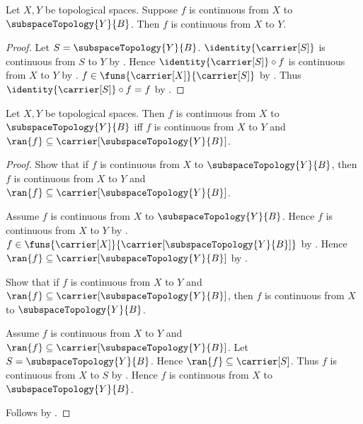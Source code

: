 \begin{theorem}\label{continuous_subspace_codomain_inclusion}
    Let $X,Y$ be topological spaces.
    Suppose $f$ is continuous from $X$ to
        $\subspaceTopology{Y}{B}$.
    Then $f$ is continuous from $X$ to $Y$.
\end{theorem}
\begin{proof}
    Let $S=\subspaceTopology{Y}{B}$.
    $\identity{\carrier[S]}$ is continuous from $S$ to $Y$
        by .
    Hence $\identity{\carrier[S]}\circ f$ is continuous from $X$ to $Y$
        by .
    $f\in\funs{\carrier[X]}{\carrier[S]}$
        by .
    Thus $\identity{\carrier[S]}\circ f=f$
        by .
\end{proof}

\begin{theorem}\label{continuous_to_subspace_iff}
    Let $X,Y$ be topological spaces.
    Then $f$ is continuous from $X$ to $\subspaceTopology{Y}{B}$ iff
        $f$ is continuous from $X$ to $Y$ and
        $\ran{f}\subseteq\carrier[\subspaceTopology{Y}{B}]$.
\end{theorem}
\begin{proof}
    Show that if $f$ is continuous from $X$ to
        $\subspaceTopology{Y}{B}$, then
        $f$ is continuous from $X$ to $Y$ and
        $\ran{f}\subseteq\carrier[\subspaceTopology{Y}{B}]$.
    \begin{subproof}
        Assume $f$ is continuous from $X$ to
            $\subspaceTopology{Y}{B}$.
        Hence $f$ is continuous from $X$ to $Y$ by
            .
        $f\in\funs{\carrier[X]}
            {\carrier[\subspaceTopology{Y}{B}]}$ by
            .
        Hence $\ran{f}\subseteq\carrier[\subspaceTopology{Y}{B}]$ by
            .
    \end{subproof}
    Show that if $f$ is continuous from $X$ to $Y$ and
        $\ran{f}\subseteq\carrier[\subspaceTopology{Y}{B}]$, then
        $f$ is continuous from $X$ to $\subspaceTopology{Y}{B}$.
    \begin{subproof}
        Assume $f$ is continuous from $X$ to $Y$ and
            $\ran{f}\subseteq\carrier[\subspaceTopology{Y}{B}]$.
        Let $S=\subspaceTopology{Y}{B}$.
        Hence $\ran{f}\subseteq\carrier[S]$.
        Thus $f$ is continuous from $X$ to $S$ by
            .
        Hence $f$ is continuous from $X$ to $\subspaceTopology{Y}{B}$.
    \end{subproof}
    Follows by \auto.
\end{proof}

